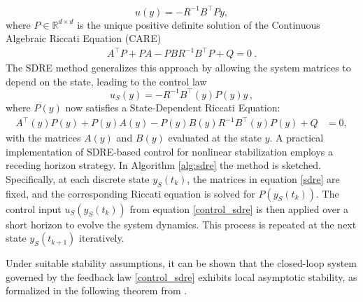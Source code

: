 \documentclass{article}
\begin{document}
\begin{equation*}
	u(y) = -R^{-1} B^{\top} P y,
\end{equation*}
where $P\in\mathbb{R}^{d\times d}$ is the unique positive definite solution of the Continuous Algebraic Riccati Equation (CARE)
\begin{align*}
	A^\top P + P A
	-P BR^{-1}B^\top P +Q = 0\ .
\end{align*}
The SDRE method generalizes this approach by allowing the system matrices to depend on the state, leading to the control law
\begin{equation}
	u_S(y) = -R^{-1} B^{\top}(y) P(y)y\,,
	\label{control_sdre}
\end{equation}
where $P(y)$ now satisfies a State-Dependent Riccati Equation:
\begin{align}
	A^\top(y) P(y) +  P(y) A(y)-P(y)B(y)R^{-1}B^\top(y)P(y)+Q & = 0,
	\label{sdre}
\end{align}
with the matrices $A(y)$ and $B(y)$ evaluated at the state $y$. A practical implementation of SDRE-based control for nonlinear stabilization employs a receding horizon strategy. In Algorithm \ref{alg:sdre} the method is sketched. Specifically, at each discrete state \(y_S(t_k)\), the matrices in equation \eqref{sdre} are fixed, and the corresponding Riccati equation is solved for 
\( P(y_S(t_k))\). The control input  \(u_S(y_S(t_k))\) from equation \eqref{control_sdre} is then applied over a short horizon to evolve the system dynamics. This process is repeated at the next state \(y_S(t_{k+1})\) iteratively. 

\begin{algorithm}[htbp]
\caption{The reduced horizon-SDRE method}
\label{alg:sdre}{
\begin{algorithmic}[1]


\EndFor 
\end{algorithmic}}
\end{algorithm}

Under suitable stability assumptions, it can be shown that the closed-loop system governed by the feedback law \eqref{control_sdre} exhibits local asymptotic stability, as formalized in the following theorem from \cite{banks2007}.
\end{document}

